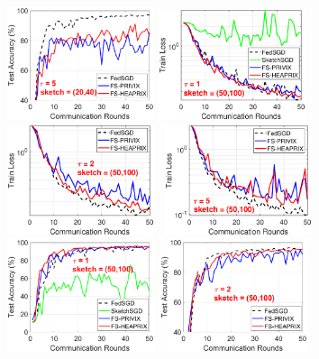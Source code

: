 \documentclass[twoside]{article}
\begin{document}
\begin{figure}[H]
\begin{center}
{		\includegraphics[width=1.7in]{MNIST_figures/local5_sketch20_iid0_test_acc.eps}\hspace{-0.2in}
		 \includegraphics[width=1.7in]{MNIST_figures/local1_sketch50_iid0_train_loss.eps} \hspace{-0.2in}
		\includegraphics[width=1.7in]{MNIST_figures/local2_sketch50_iid0_train_loss.eps} \hspace{-0.2in}
		}
		\mbox{
		\includegraphics[width=1.7in]{MNIST_figures/local5_sketch50_iid0_train_loss.eps}\hspace{-0.2in}
				\includegraphics[width=1.7in]{MNIST_figures/local1_sketch50_iid0_test_acc.eps} \hspace{-0.2in}
		\includegraphics[width=1.7in]{MNIST_figures/local2_sketch50_iid0_test_acc.eps} \hspace{-0.2in}
}
\end{center}
\end{figure}
\end{document}
